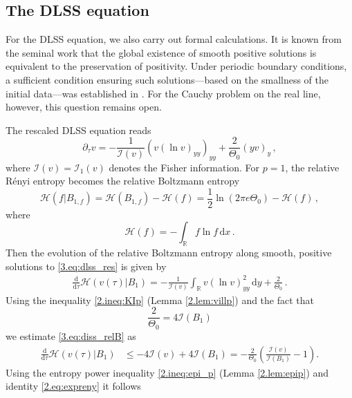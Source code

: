 \documentclass[12pt]{amsart}
\let\pa\partial
\newcommand{\R}{{\mathbb R}}
\newcommand{\dd}{{\mathrm{d}}}
\newcommand{\M}{\Theta}
\newcommand{\I}{\mathcal{I}}
\newcommand{\entropy}{\mathcal{H}}
\theoremstyle{plain}
\theoremstyle{definition}
\theoremstyle{remark}
\begin{document}


\subsection{The DLSS equation}\label{sec:dlss} For the DLSS equation, we also carry out formal calculations. It is known from the seminal work \cite{BLS94} that the global existence of smooth positive solutions is equivalent to the preservation of positivity. Under periodic boundary conditions, a sufficient condition ensuring such solutions—based on the smallness of the initial data—was established in \cite{CCT05}. For the Cauchy problem on the real line, however, this question remains open.

The rescaled DLSS equation reads
\begin{equation}\label{3.eq:dlss_res}
        \pa_\tau v = -\frac{1}{\I(v)}\left(v\left(\ln v\right)_{yy}\right)_{yy} + \frac{2}{\M_0}(y v)_y\,,
    \end{equation}
where $\I(v) = \I_1(v)$ denotes the Fisher information.
For $p=1$, the relative R\'enyi entropy becomes the relative Boltzmann entropy
\begin{equation*}
    \entropy(f|B_{1,f}) = \entropy(B_{1,f}) - \entropy(f) = \frac{1}{2}\ln(2\pi e\M_0) - \entropy(f)\,,
\end{equation*}
where 
\begin{equation*}
    \entropy(f) = -\int_{\R}f\ln f\, \dd x\,.
\end{equation*}
Then the evolution of the relative Boltzmann entropy along smooth, positive solutions to \eqref{3.eq:dlss_res} is given by
\begin{align}\label{3.eq:diss_relB}
    \frac{\dd}{\dd \tau}\entropy(v(\tau)|B_1) = -\frac{1}{\I(v)} \int_\R v\left(\ln v\right)_{yy}^2\, \dd y + \frac{2}{\M_0}\,.
\end{align}
Using the inequality \eqref{2.ineq:KIp} (Lemma \ref{2.lem:villp}) and the fact that
\begin{equation*}
    \frac{2}{\M_0} = 4 \I(B_1)
\end{equation*}
we estimate \eqref{3.eq:diss_relB} as
\begin{align}\nonumber
    \frac{\dd}{\dd \tau}\entropy(v(\tau)|B_1) &\leq -4\I(v) + 4\I(B_1) = -\frac{2}{\M_0}\left(\frac{\I(v)}{\I(B_1)} - 1\right).\label{3.ineq:rendiss3}
\end{align}
Using the entropy power inequality \eqref{2.ineq:epi_p} (Lemma \ref{2.lem:epip}) and identity \eqref{2.eq:expreny} it follows 
\end{document}
